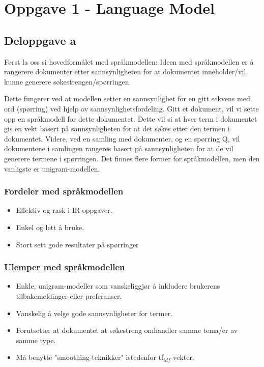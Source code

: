\section*{Oppgave 1 - Language Model}
\subsection*{Deloppgave a}

\noindent Først la oss si hovedformålet med språkmodellen: Ideen med språkmodellen er å rangerere dokumenter etter sannsynligheten for at dokumentet inneholder/vil kunne generere søkestrengen/spørringen. 


Dette fungerer ved at modellen setter en sannsynlighet for en gitt sekvens med ord (spørring) ved hjelp av sannsynlighetsfordeling. Gitt et dokument, vil vi sette opp en språkmodell for dette dokumentet. Dette vil si at hver term i dokumentet gis en vekt basert på sannsynligheten for at det søkes etter den termen i dokumentet. Videre, ved en samling med dokumenter, og en spørring Q, vil dokumentene i samlingen rangeres basert på sannsynligheten for at de vil generere termene i spørringen. Det finnes flere former for språkmodellen, men den vanligste er unigram-modellen. 

\subsubsection*{Fordeler med språkmodellen}

\begin{itemize}
    \item Effektiv og rask i IR-oppgaver.
    \item Enkel og lett å bruke.
    \item Stort sett gode resultater på spørringer
\end{itemize}

\subsubsection*{Ulemper med språkmodellen}

\begin{itemize}
    \item Enkle, unigram-modeller som vanskeliggjør å inkludere brukerens tilbakemeldinger eller preferanser.
    \item Vanskelig å velge gode sannsynligheter for termer.
    \item Forutsetter at dokumentet at søkestreng omhandler samme tema/er av samme type.
    \item Må benytte "smoothing-teknikker" istedenfor tf$_{idf}$-vekter.
\end{itemize}

